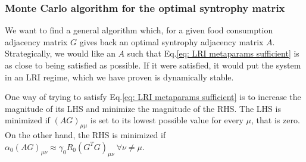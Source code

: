 \documentclass[12pt, titlepage]{report}
\begin{document}
\subsubsection{Monte Carlo algorithm for the optimal syntrophy matrix} \label{section: methods LRI MC solver}
We want to find a general algorithm which, for a given food consumption adjacency matrix $G$ gives back an optimal syntrophy adjacency matrix $A$. Strategically, we would like an $A$ such that Eq.\eqref{eq: LRI metaparams sufficient} is as close to being satisfied as possible. If it were satisfied, it would put the system in an LRI regime, which we have proven is dynamically stable.

One way of trying to satisfy Eq.\eqref{eq: LRI metaparams sufficient} is to increase the magnitude of its LHS and minimize the magnitude of the RHS. The LHS is minimized if $(AG)_{\mu\mu}$ is set to its lowest possible value for every $\mu$, that is zero. On the other hand, the RHS is minimized if $\alpha_0(AG)_{\mu\nu}\approx\gamma_0R_0 (G^TG)_{\mu\nu} \ \forall \nu\neq\mu$.
\end{document}
